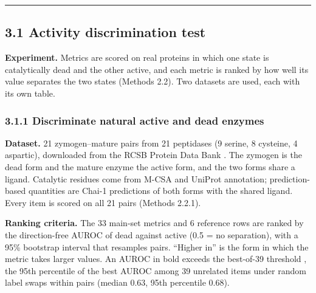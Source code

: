 \documentclass[
  10pt,
]{article}
\DeclareRobustCommand{\_}{\textunderscore\hspace{0pt}}
\begin{document}
\begin{center}\rule{0.5\linewidth}{0.5pt}\end{center}

\subsection{3.1
Activity
discrimination test}

\textbf{Experiment.}
Metrics are scored
on real proteins in
which one state is
catalytically dead
and the other
active, and each
metric is ranked by
how well its value
separates the two
states (Methods
2.2). Two datasets
are used, each with
its own table.

\subsubsection{3.1.1
Discriminate natural
active and dead
enzymes}

\textbf{Dataset.} 21
zymogen--mature
pairs from 21
peptidases (9
serine, 8 cysteine,
4 aspartic),
downloaded from the
RCSB Protein Data
Bank
\cite{burley2025,berman2000}.
The zymogen is the
dead form and the
mature enzyme the
active form, and the
two forms share a
ligand. Catalytic
residues come from
M-CSA
\cite{ribeiro2018}
and UniProt
\cite{uniprot2023}
annotation;
prediction-based
quantities are
Chai-1
\cite{chai2024}
predictions of both
forms with the
shared ligand. Every
item is scored on
all 21 pairs
(Methods 2.2.1).

\textbf{Ranking
criteria.} The 33
main-set metrics and
6 reference rows are
ranked by the
direction-free AUROC
\cite{hanley1982,mann1947}
of dead against
active (0.5 = no
separation), with a
95\% bootstrap
interval that
resamples pairs.
``Higher in'' is the
form in which the
metric takes larger
values. An AUROC in
bold exceeds the
best-of-39 threshold
\cite{westfall1993},
the 95th percentile
of the best AUROC
among 39 unrelated
items under random
label swaps within
pairs (median 0.63,
95th percentile
0.68).
\end{document}
